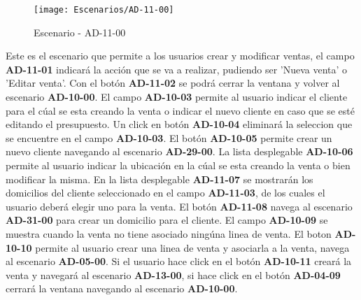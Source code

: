 \begin{figure}[H]
\centering
\texttt{[image: Escenarios/AD-11-00]}
\caption{Escenario - AD-11-00}
\label{fig:AD-11-00}
\end{figure}
Este es el escenario que permite a los usuarios crear y modificar ventas, el campo \textbf{AD-11-01} indicará la acción que se va a realizar, pudiendo ser 'Nueva venta' o 'Editar venta'. Con el botón \textbf{AD-11-02} se podrá cerrar la ventana y volver al escenario \textbf{AD-10-00}.
El campo \textbf{AD-10-03} permite al usuario indicar el cliente para el cúal se esta creando la venta o indicar el nuevo cliente en caso que se esté editando el presupuesto. Un click en botón \textbf{AD-10-04} eliminará la seleccion que se encuentre en el campo \textbf{AD-10-03}. El botón \textbf{AD-10-05} permite crear un nuevo cliente navegando al escenario \textbf{AD-29-00}. La lista desplegable \textbf{AD-10-06} permite al usuario indicar la ubicación en la cúal se esta creando la venta o bien modificar la misma. En la lista desplegable \textbf{AD-11-07} se mostrarán los domicilios del cliente seleccionado en el campo \textbf{AD-11-03}, de los cuales el usuario deberá elegir uno para la venta. El botón \textbf{AD-11-08} navega al escenario \textbf{AD-31-00} para crear un domicilio para el cliente.
El campo \textbf{AD-10-09} se muestra cuando la venta no tiene asociado ningúna linea de venta. El boton \textbf{AD-10-10} permite al usuario crear una linea de venta y asociarla a la venta, navega al escenario \textbf{AD-05-00}. Si el usuario hace click en el botón \textbf{AD-10-11} creará la venta y navegará al escenario \textbf{AD-13-00}, si hace click en el botón \textbf{AD-04-09} cerrará la ventana navegando al escenario \textbf{AD-10-00}.
\clearpage

